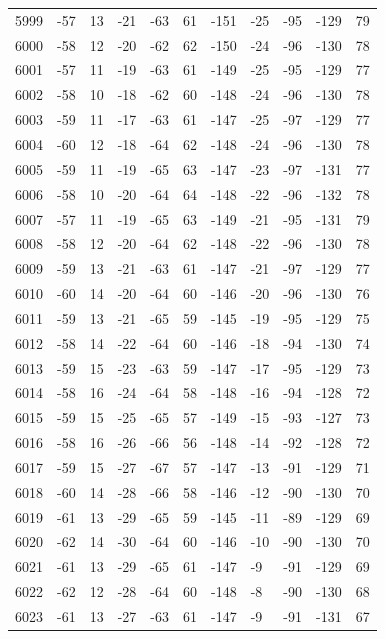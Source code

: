 \begin{table}[H]
\begin{tabular}{lllllllllll}
5999 & -57 & 13 & -21 & -63 & 61 & -151 & -25 & -95 & -129 & 79 \\
6000 & -58 & 12 & -20 & -62 & 62 & -150 & -24 & -96 & -130 & 78 \\
6001 & -57 & 11 & -19 & -63 & 61 & -149 & -25 & -95 & -129 & 77 \\
6002 & -58 & 10 & -18 & -62 & 60 & -148 & -24 & -96 & -130 & 78 \\
6003 & -59 & 11 & -17 & -63 & 61 & -147 & -25 & -97 & -129 & 77 \\
6004 & -60 & 12 & -18 & -64 & 62 & -148 & -24 & -96 & -130 & 78 \\
6005 & -59 & 11 & -19 & -65 & 63 & -147 & -23 & -97 & -131 & 77 \\
6006 & -58 & 10 & -20 & -64 & 64 & -148 & -22 & -96 & -132 & 78 \\
6007 & -57 & 11 & -19 & -65 & 63 & -149 & -21 & -95 & -131 & 79 \\
6008 & -58 & 12 & -20 & -64 & 62 & -148 & -22 & -96 & -130 & 78 \\
6009 & -59 & 13 & -21 & -63 & 61 & -147 & -21 & -97 & -129 & 77 \\
6010 & -60 & 14 & -20 & -64 & 60 & -146 & -20 & -96 & -130 & 76 \\
6011 & -59 & 13 & -21 & -65 & 59 & -145 & -19 & -95 & -129 & 75 \\
6012 & -58 & 14 & -22 & -64 & 60 & -146 & -18 & -94 & -130 & 74 \\
6013 & -59 & 15 & -23 & -63 & 59 & -147 & -17 & -95 & -129 & 73 \\
6014 & -58 & 16 & -24 & -64 & 58 & -148 & -16 & -94 & -128 & 72 \\
6015 & -59 & 15 & -25 & -65 & 57 & -149 & -15 & -93 & -127 & 73 \\
6016 & -58 & 16 & -26 & -66 & 56 & -148 & -14 & -92 & -128 & 72 \\
6017 & -59 & 15 & -27 & -67 & 57 & -147 & -13 & -91 & -129 & 71 \\
6018 & -60 & 14 & -28 & -66 & 58 & -146 & -12 & -90 & -130 & 70 \\
6019 & -61 & 13 & -29 & -65 & 59 & -145 & -11 & -89 & -129 & 69 \\
6020 & -62 & 14 & -30 & -64 & 60 & -146 & -10 & -90 & -130 & 70 \\
6021 & -61 & 13 & -29 & -65 & 61 & -147 & -9 & -91 & -129 & 69 \\
6022 & -62 & 12 & -28 & -64 & 60 & -148 & -8 & -90 & -130 & 68 \\
6023 & -61 & 13 & -27 & -63 & 61 & -147 & -9 & -91 & -131 & 67 \\

\end{tabular}
\end{table}
